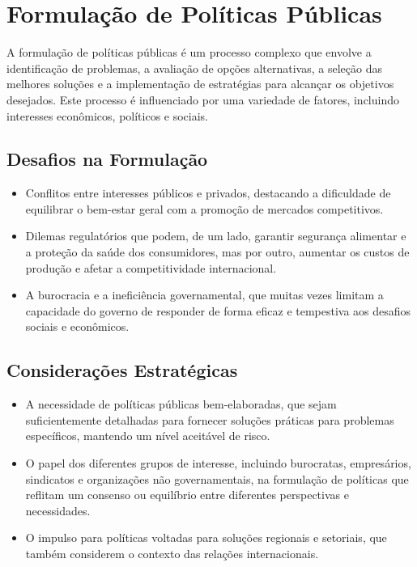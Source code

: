 \documentclass[
   article,       
   12pt,          
   oneside,       
   a4paper,       
   english,       
   brazil,        
   sumario=tradicional
   ]{abntex2}
\begin{document}
\section{Formulação de Políticas Públicas}
A formulação de políticas públicas é um processo complexo que envolve a identificação de problemas, a avaliação de opções alternativas, a seleção das melhores soluções e a implementação de estratégias para alcançar os objetivos desejados. Este processo é influenciado por uma variedade de fatores, incluindo interesses econômicos, políticos e sociais.
    \subsection{Desafios na Formulação}
       \begin{itemize}
            \item Conflitos entre interesses públicos e privados, destacando a dificuldade de equilibrar o bem-estar geral com a promoção de mercados competitivos.
            \item Dilemas regulatórios que podem, de um lado, garantir segurança alimentar e a proteção da saúde dos consumidores, mas por outro, aumentar os custos de produção e afetar a competitividade internacional.
            \item A burocracia e a ineficiência governamental, que muitas vezes limitam a capacidade do governo de responder de forma eficaz e tempestiva aos desafios sociais e econômicos.
        \end{itemize}
    \subsection{Considerações Estratégicas}
        \begin{itemize}
            \item A necessidade de políticas públicas bem-elaboradas, que sejam suficientemente detalhadas para fornecer soluções práticas para problemas específicos, mantendo um nível aceitável de risco.
            \item O papel dos diferentes grupos de interesse, incluindo burocratas, empresários, sindicatos e organizações não governamentais, na formulação de políticas que reflitam um consenso ou equilíbrio entre diferentes perspectivas e necessidades.
            \item O impulso para políticas voltadas para soluções regionais e setoriais, que também considerem o contexto das relações internacionais.
        \end{itemize}
\end{document}
